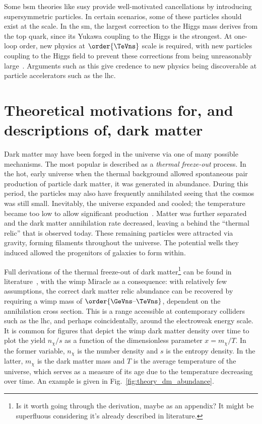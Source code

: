 Some \acrshort{bsm} theories like \acrlong{susy} provide well-motivated cancellations by introducing supersymmetric particles. In certain scenarios, some of these particles should exist at the \TeVns scale. In the \acrshort{sm}, the largest correction to the Higgs mass derives from the top quark, since its Yukawa coupling to the Higgs is the strongest. At one-loop order, new physics at $\order{\TeVns}$ scale is required, with new particles coupling to the Higgs field to prevent these corrections from being unreasonably large~\cite{Farina:2013ssa}. Arguments such as this give credence to new physics being discoverable at particle accelerators such as the \acrlong{lhc}.




\section{Theoretical motivations for, and descriptions of, dark matter}
\label{sec:theory_dark_matter}


Dark matter may have been forged in the universe via one of many possible mechanisms. The most popular is described as a \emph{thermal freeze-out} process. In the hot, early universe when the thermal background allowed spontaneous pair production of particle dark matter, it was generated in abundance. During this period, the particles may also have frequently annihilated seeing that the cosmos was still small. Inevitably, the universe expanded and cooled; the temperature became too low to allow significant production~\cite{Baldes:2017gzw}. Matter was further separated and the dark matter annihilation rate decreased, leaving a behind the ``thermal relic'' that is observed today. These remaining particles were attracted via gravity, forming filaments throughout the universe. The potential wells they induced allowed the progenitors of galaxies to form within.

Full derivations of the thermal freeze-out of dark matter\footnote{Is it worth going through the derivation, maybe as an appendix? It might be superfluous considering it's already described in literature.} can be found in literature~\cite{cosmic_abundances_stable_particles,Bender:2012gc}, with the \acrshort{wimp} Miracle as a consequence: with relatively few assumptions, the correct dark matter relic abundance can be recovered by requiring a \acrshort{wimp} mass of $\order{\text{\GeVns--\TeVns}}$, dependent on the annihilation cross section. This is a range accessible at contemporary colliders such as the \acrshort{lhc}, and perhaps coincidentally, around the electroweak energy scale. It is common for figures that depict the \acrshort{wimp} dark matter density over time to plot the yield $n_{\chi}/s$ as a function of the dimensionless parameter $x = m_{\chi}/T$. In the former variable, $n_{\chi}$ is the number density and $s$ is the entropy density. In the latter, $m_{\chi}$ is the dark matter mass and $T$ is the average temperature of the universe, which serves as a measure of its age due to the temperature decreasing over time. An example is given in Fig.~\ref{fig:theory_dm_abundance}.

